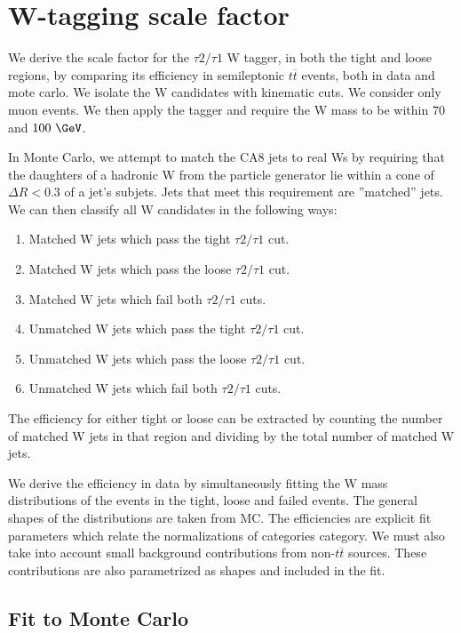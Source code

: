 \clearpage
\section{W-tagging scale factor}

We derive the scale factor for the $\tau 2/\tau 1$ W tagger, in both the tight and loose regions, by
comparing its efficiency in semileptonic $t\overline{t}$ events, both
in data and mote carlo. We isolate the W candidates with kinematic
cuts. We consider only muon events. We then apply the tagger and require the W mass to be within
$70$ and $100~\GeVcc$.

In Monte Carlo, we attempt to match the CA8 jets to real Ws by
requiring that the daughters of a hadronic W from the particle generator lie within a
cone of $\Delta R < 0.3$ of a jet's subjets. Jets that meet this
requirement are ''matched'' jets. We can then classify all W
candidates in the following ways:
\begin{enumerate}
\item Matched W jets which pass the tight $\tau 2/\tau 1$ cut.
\item Matched W jets which pass the loose $\tau 2/\tau 1$ cut.
\item Matched W jets which fail both $\tau 2/\tau 1$ cuts.
\item Unmatched W jets which pass the tight $\tau 2/\tau 1$ cut.
\item Unmatched W jets which pass the loose $\tau 2/\tau 1$ cut.
\item Unmatched W jets which fail both $\tau 2/\tau 1$ cuts.
\end{enumerate}
The efficiency for either tight or loose can be extracted by counting the number of matched
W jets in that region and dividing by the total number of
matched W jets.

We derive the efficiency in data by simultaneously fitting the
W mass distributions of the events in the tight, loose and failed events. The general shapes of the distributions are taken from MC. The efficiencies are explicit fit parameters which relate the normalizations of categories category. We must also take into account small background contributions from non-$t\overline{t}$ sources. These contributions are also parametrized as shapes and included in the fit.

\subsection{Fit to Monte Carlo}

